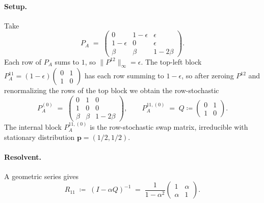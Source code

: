 \documentclass{article}
\theoremstyle{plain}
\theoremstyle{definition}
\newcommand{\arXivtag}[1][]{#1}
\begin{document}
\paragraph{Setup.} Take
\begin{equation}\label{eq:exA-K}
	P_A \;=\; \begin{pmatrix} 0 & 1-\epsilon & \epsilon \\ 1-\epsilon & 0 & \epsilon \\ \beta & \beta & 1-2\beta \end{pmatrix}.
\end{equation}
Each row of $P_A$ sums to $1$, so $\|P^{12}\|_\infty = \epsilon$. The top-left block $P^{11}_A = (1-\epsilon)\begin{pmatrix}0&1\\1&0\end{pmatrix}$ has each row summing to $1-\epsilon$, so after zeroing $P^{12}$ and renormalizing \arXivtag[the rows of the top block] we obtain the row-stochastic
	\begin{equation}\label{eq:exA-P0}
		P^{(0)}_A \;=\; \begin{pmatrix} 0 & 1 & 0 \\ 1 & 0 & 0 \\ \beta & \beta & 1-2\beta \end{pmatrix},
		\qquad
		P^{11,(0)}_A \;=\; Q \coloneqq \begin{pmatrix} 0 & 1 \\ 1 & 0 \end{pmatrix}.
	\end{equation}
	The internal block $P^{11,(0)}_A$ is the row-stochastic swap matrix, irreducible with stationary distribution $\mathbf{p} = (1/2, 1/2)$.

\paragraph{Resolvent.} A geometric series gives
	\begin{equation}\label{eq:exA-resolvent}
		R_{11} \;\coloneqq\; (I - \alpha Q)^{-1} \;=\; \frac{1}{1-\alpha^2}\begin{pmatrix} 1 & \alpha \\ \alpha & 1 \end{pmatrix}.
\end{equation}
\end{document}
